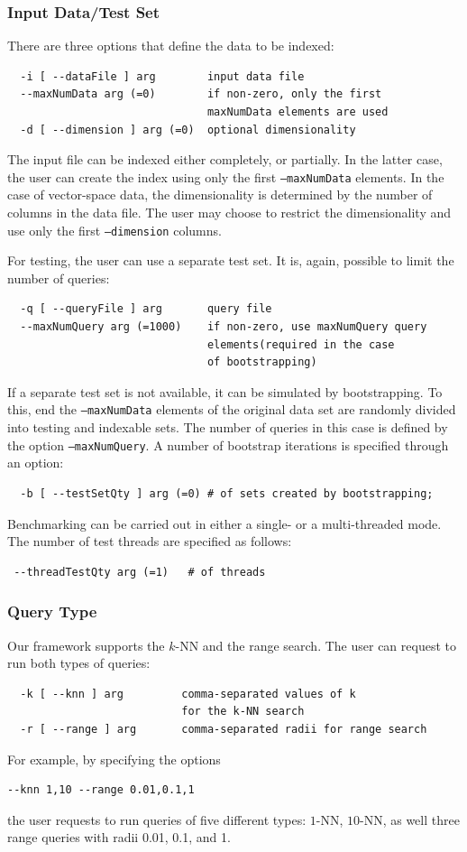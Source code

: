 \documentclass[runningheads,a4paper]{llncs}
\newcommand{\ttt}[1]{\texttt{#1}}
\newcommand{\knn}{$k$-NN }
\begin{document}
{\subsubsection{Input Data/Test Set}
There are three options that define the data to be indexed:
\begin{verbatim}
  -i [ --dataFile ] arg        input data file
  --maxNumData arg (=0)        if non-zero, only the first 
                               maxNumData elements are used
  -d [ --dimension ] arg (=0)  optional dimensionality
\end{verbatim}
The input file can be indexed either completely, or partially.
In the latter case, the user can create the index using only
the first \ttt{--maxNumData} elements.
In the case of vector-space data, the dimensionality is determined
by the number of columns in the data file.
The user may choose to restrict the dimensionality and use only the first 
\ttt{--dimension} columns.

For testing, the user can use a separate test set.
It is, again, possible to limit the number of queries:
\begin{verbatim}
  -q [ --queryFile ] arg       query file
  --maxNumQuery arg (=1000)    if non-zero, use maxNumQuery query 
                               elements(required in the case 
                               of bootstrapping)
\end{verbatim}
If a separate test set is not available, it can be simulated by bootstrapping.
To this, end the \ttt{--maxNumData} elements of the original data set
are randomly divided into testing and indexable sets.
The number of queries in this case is defined by the option \ttt{--maxNumQuery}.
A number of bootstrap iterations is specified through an option:
\begin{verbatim}
  -b [ --testSetQty ] arg (=0) # of sets created by bootstrapping; 
\end{verbatim}
Benchmarking can be carried out in either a single- or a multi-threaded
mode. The number of test threads are specified as follows:
\begin{verbatim}
 --threadTestQty arg (=1)   # of threads
\end{verbatim}

\subsubsection{Query Type} 
Our framework supports the \knn and the range search.
The user can request to run both types of queries:
\begin{verbatim}
  -k [ --knn ] arg         comma-separated values of k 
                           for the k-NN search
  -r [ --range ] arg       comma-separated radii for range search
\end{verbatim}
For example, by specifying the options 
\begin{verbatim}
--knn 1,10 --range 0.01,0.1,1
\end{verbatim}
the user requests to run queries of five different types: $1$-NN, $10$-NN,
as well three range queries with radii 0.01, 0.1, and 1.

}
\end{document}
